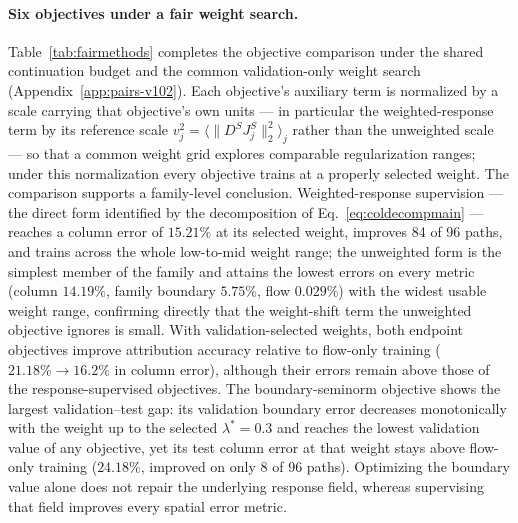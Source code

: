 \paragraph{Six objectives under a fair weight search.}
Table~\ref{tab:fairmethods} completes the objective comparison under
the shared continuation budget and the common validation-only weight
search (Appendix~\ref{app:pairs-v102}). Each objective's auxiliary
term is normalized by a scale carrying that objective's own units ---
in particular the weighted-response term by its reference scale
$v_j^2=\langle\|D^SJ_j^S\|_2^2\rangle_j$ rather than the unweighted
scale --- so that a common weight grid explores comparable
regularization ranges; under this normalization every objective trains
at a properly selected weight. The comparison supports a family-level
conclusion. Weighted-response supervision --- the direct form
identified by the decomposition of Eq.~\eqref{eq:coldecompmain} ---
reaches a column error of $15.21\%$ at its selected weight, improves
84 of 96 paths, and trains across the whole low-to-mid weight range;
the unweighted form is the simplest member of the family and attains
the lowest errors on every metric (column $14.19\%$, family boundary
$5.75\%$, flow $0.029\%$) with the widest usable weight range,
confirming directly that the weight-shift term the unweighted
objective ignores is small. With validation-selected weights, both
endpoint objectives improve attribution accuracy relative to flow-only
training ($21.18\%\to16.2\%$ in column error), although their errors
remain above those of the response-supervised objectives. The
boundary-seminorm objective shows the largest validation--test gap:
its validation boundary error decreases monotonically with the weight
up to the selected $\lambda^*=0.3$ and reaches the lowest validation
value of any objective, yet its test column error at that weight stays
above flow-only training ($24.18\%$, improved on only 8 of 96 paths).
Optimizing the boundary value alone does not repair the underlying
response field, whereas supervising that field improves every spatial
error metric.
